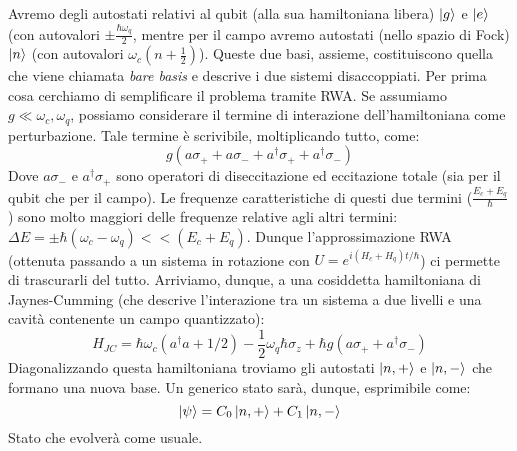 Avremo degli autostati relativi al qubit (alla sua hamiltoniana libera) $\ket g$ e $\ket e$ (con autovalori $\pm \frac{\hbar\omega_q}{2}$, mentre per il campo avremo autostati (nello spazio di Fock) $\ket n$ (con autovalori $\omega_c(n+\frac{1}{2})$).
Queste due basi, assieme, costituiscono quella che viene chiamata \textit{bare basis} e descrive i due sistemi disaccoppiati.
Per prima cosa cerchiamo di semplificare il problema tramite RWA. Se assumiamo $g\ll \omega_c,\omega_q$, possiamo considerare il termine di interazione dell'hamiltoniana come perturbazione.
Tale termine è scrivibile, moltiplicando tutto, come:
\begin{equation*}
    g(a\sigma_+ + a\sigma_- + a^\dagger \sigma_+ +a^\dagger \sigma_-)
\end{equation*}
Dove $a\sigma_-$ e $a^\dagger \sigma_+$ sono operatori di diseccitazione ed eccitazione totale (sia per il qubit che per il campo). Le frequenze caratteristiche di questi due termini ($\frac{E_c+E_q}{\hbar}$) sono molto maggiori delle frequenze relative agli altri termini: $\Delta E=\pm\hbar(\omega_c-\omega_q)<<(E_c+E_q)$. Dunque l'approssimazione RWA (ottenuta passando a un sistema in rotazione con $U=e^{i(H_c+H_q) t/\hbar}$) ci permette di trascurarli del tutto.
Arriviamo, dunque, a una cosiddetta hamiltoniana di Jaynes-Cumming (che descrive l'interazione tra un sistema a due livelli e una cavità contenente un campo quantizzato):
\begin{equation*}
    H_{JC}=\hbar \omega_c ( a^\dagger a + 1/2) - \frac{1}{2}\omega_q \hbar \sigma_z + \hbar g (a \sigma_ + + a ^\dagger \sigma_-)
\end{equation*}
Diagonalizzando questa hamiltoniana troviamo gli autostati $\ket{n, +}$ e $\ket{n, -}$ che formano una nuova base. Un generico stato sarà, dunque, esprimibile come:
\begin{equation*}
    \ket \psi = C_0 \ket{n,+} + C_1 \ket{n , -}
\end{equation*}
Stato che evolverà come usuale.

